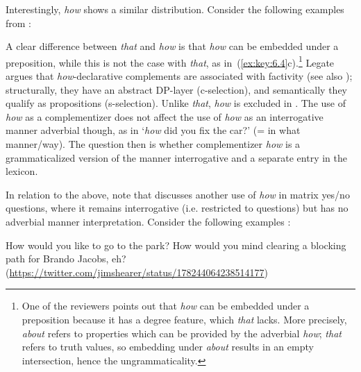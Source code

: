 \documentclass[output=paper]{langsci/langscibook}
\begin{document}
\largerpage[2]
Interestingly,  \emph{how} shows a similar distribution. Consider the
following examples from \citet[122]{Legate2010}:

\ea\label{ex:key:6.4}
	\z
\z

A clear difference between \emph{that} and \emph{how} is that \emph{how}
can be embedded under a preposition, while this is not the case with
\emph{that}, as in~(\ref{ex:key:6.4}c).\footnote{One of the reviewers points out that
\emph{how} can be embedded under a preposition because it has a degree
feature, which \emph{that} lacks. More precisely, \emph{about} refers to
properties which can be provided by the adverbial \emph{how}; \emph{that}
refers to truth values, so embedding under \emph{about} results in an empty
intersection, hence the ungrammaticality.}  Legate argues that
\emph{how}{}-declarative complements are associated with factivity (see also
\citealt{Nye2013}); structurally, they have an abstract DP-layer (c-selection),
and semantically they qualify as propositions (s-selection). Unlike
\emph{that}, \emph{how} is excluded in . The use of
\emph{how} as a complementizer does not affect the use of \emph{how} as an
interrogative manner adverbial though, as in ‘\emph{how} did you fix the
car?’ (= in what manner/way). The question then is whether complementizer
\emph{how} is a grammaticalized version of the manner interrogative and a
separate entry in the lexicon.

In relation to the above, note that \citet{vanGelderen2015} discusses another
use of \emph{how} in matrix yes/no questions, where it remains interrogative
(i.e. restricted to questions) but has no adverbial manner interpretation.
Consider the following examples \parencite[164--165]{vanGelderen2015}:

\ea\label{ex:key:6.5}
	\ea How would you like to go to the park?
	\ex How would you mind clearing a blocking path for Brando Jacobs, eh?
		(\url{https://twitter.com/jimshearer/status/178244064238514177})
	\z
\z
\end{document}
